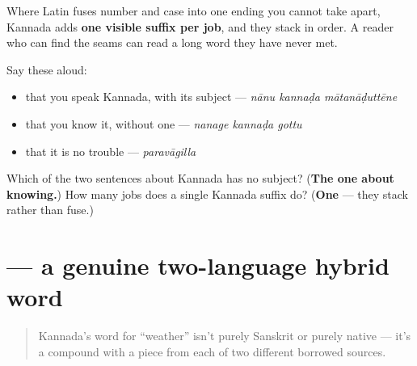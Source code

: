 \begin{grammarlens}[title={Grammar Lens: one suffix per job}]
Where Latin fuses number and case into one ending you cannot take apart, Kannada adds \textbf{one visible suffix per job}, and they stack in order. A reader who can find the seams can read a long word they have never met.

Say these aloud:

\begin{itemize}
\raggedright
  \item that you speak Kannada, with its subject — \emph{nānu kannaḍa mātanāḍuttēne}
  \item that you know it, without one — \emph{nanage kannaḍa gottu}
  \item that it is no trouble — \emph{paravāgilla}
\end{itemize}
\end{grammarlens}

\begin{tcolorbox}[breakable,colback=teal!4,colframe=teal!35!black,title={Before you move on}]
Which of the two sentences about Kannada has no subject? (\textbf{The one about knowing.}) How many jobs does a single Kannada suffix do? (\textbf{One} — they stack rather than fuse.)
\end{tcolorbox}
\section[\texorpdfstring{\kn{ಹವಾಮಾನ} (havāmāna)}{ಹವಾಮಾನ (havāmāna)}]{ — a genuine two-language hybrid word}

\label{lesson:KA-C20-havamana}



\begin{quote}
Kannada's word for \textquotedblleft{}weather\textquotedblright{} isn't purely Sanskrit or purely native — it's a compound with a piece from each of two different borrowed sources.
\end{quote}

